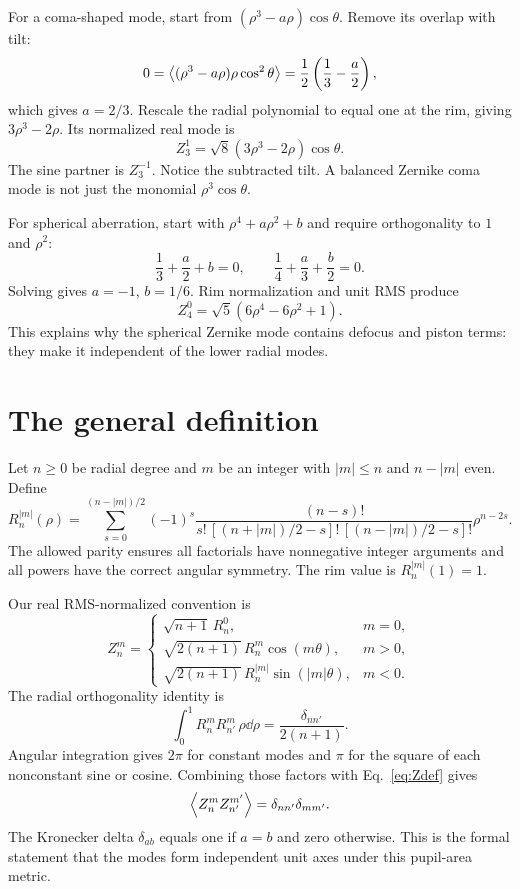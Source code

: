 For a coma-shaped mode, start from
$(\rho^3-a\rho)\cos\theta$. Remove its overlap with tilt:
\[
0=\left\langle (\rho^3-a\rho)\rho\cos^2\theta\right\rangle
=\frac12\left(\frac13-\frac a2\right),
\]
which gives $a=2/3$. Rescale the radial polynomial to equal one at
the rim, giving $3\rho^3-2\rho$. Its normalized real mode is
\begin{equation}
Z_3^1=\sqrt8(3\rho^3-2\rho)\cos\theta.
\label{eq:coma}
\end{equation}
The sine partner is $Z_3^{-1}$. Notice the subtracted tilt. A balanced
Zernike coma mode is not just the monomial $\rho^3\cos\theta$.

For spherical aberration, start with $\rho^4+a\rho^2+b$ and require
orthogonality to $1$ and $\rho^2$:
\[
\frac13+\frac a2+b=0,\qquad
\frac14+\frac a3+\frac b2=0.
\]
Solving gives $a=-1$, $b=1/6$. Rim normalization and unit RMS produce
\begin{equation}
Z_4^0=\sqrt5(6\rho^4-6\rho^2+1).
\label{eq:spherical}
\end{equation}
This explains why the spherical Zernike mode contains defocus and piston
terms: they make it independent of the lower radial modes.

\section{The general definition}
Let $n\geq0$ be radial degree and $m$ be an integer with
$|m|\leq n$ and $n-|m|$ even. Define
\begin{equation}
R_n^{|m|}(\rho)=
\sum_{s=0}^{(n-|m|)/2}
(-1)^s
\frac{(n-s)!}
{s!\,[(n+|m|)/2-s]!\,[(n-|m|)/2-s]!}
\rho^{n-2s}.
\label{eq:radial}
\end{equation}
The allowed parity ensures all factorials have nonnegative integer
arguments and all powers have the correct angular symmetry.
The rim value is $R_n^{|m|}(1)=1$.

Our real RMS-normalized convention is
\begin{equation}
Z_n^m=
\begin{cases}
\sqrt{n+1}\,R_n^0,&m=0,\\
\sqrt{2(n+1)}\,R_n^m\cos(m\theta),&m>0,\\
\sqrt{2(n+1)}\,R_n^{|m|}\sin(|m|\theta),&m<0.
\end{cases}
\label{eq:Zdef}
\end{equation}
The radial orthogonality identity is
\[
\int_0^1R_n^mR_{n'}^m\,\rho\dd\rho
=\frac{\delta_{nn'}}{2(n+1)}.
\]
Angular integration gives $2\pi$ for constant modes and $\pi$ for
the square of each nonconstant sine or cosine. Combining those factors
with Eq.~\eqref{eq:Zdef} gives
\begin{equation}
\left\langle Z_n^mZ_{n'}^{m'}\right\rangle=\delta_{nn'}\delta_{mm'}.
\label{eq:Zorth}
\end{equation}
The Kronecker delta $\delta_{ab}$ equals one if $a=b$ and zero otherwise.
This is the formal statement that the modes form independent unit axes
under this pupil-area metric.

